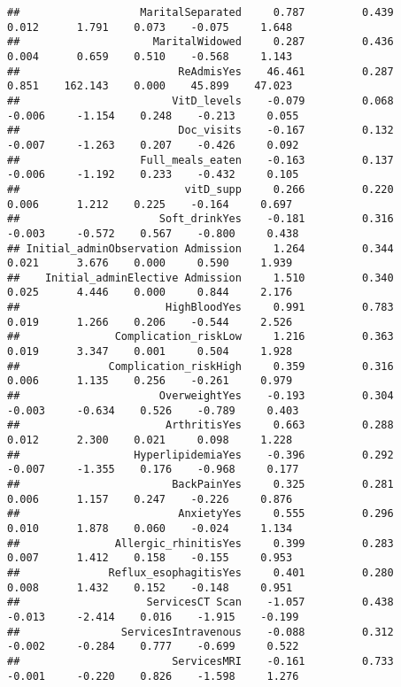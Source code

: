 \documentclass[
]{article}
\begin{document}
\begin{verbatim}
##                   MaritalSeparated     0.787         0.439        0.012      1.791    0.073    -0.075     1.648 
##                     MaritalWidowed     0.287         0.436        0.004      0.659    0.510    -0.568     1.143 
##                         ReAdmisYes    46.461         0.287        0.851    162.143    0.000    45.899    47.023 
##                        VitD_levels    -0.079         0.068       -0.006     -1.154    0.248    -0.213     0.055 
##                         Doc_visits    -0.167         0.132       -0.007     -1.263    0.207    -0.426     0.092 
##                   Full_meals_eaten    -0.163         0.137       -0.006     -1.192    0.233    -0.432     0.105 
##                          vitD_supp     0.266         0.220        0.006      1.212    0.225    -0.164     0.697 
##                      Soft_drinkYes    -0.181         0.316       -0.003     -0.572    0.567    -0.800     0.438 
## Initial_adminObservation Admission     1.264         0.344        0.021      3.676    0.000     0.590     1.939 
##    Initial_adminElective Admission     1.510         0.340        0.025      4.446    0.000     0.844     2.176 
##                       HighBloodYes     0.991         0.783        0.019      1.266    0.206    -0.544     2.526 
##               Complication_riskLow     1.216         0.363        0.019      3.347    0.001     0.504     1.928 
##              Complication_riskHigh     0.359         0.316        0.006      1.135    0.256    -0.261     0.979 
##                      OverweightYes    -0.193         0.304       -0.003     -0.634    0.526    -0.789     0.403 
##                       ArthritisYes     0.663         0.288        0.012      2.300    0.021     0.098     1.228 
##                  HyperlipidemiaYes    -0.396         0.292       -0.007     -1.355    0.176    -0.968     0.177 
##                        BackPainYes     0.325         0.281        0.006      1.157    0.247    -0.226     0.876 
##                         AnxietyYes     0.555         0.296        0.010      1.878    0.060    -0.024     1.134 
##               Allergic_rhinitisYes     0.399         0.283        0.007      1.412    0.158    -0.155     0.953 
##              Reflux_esophagitisYes     0.401         0.280        0.008      1.432    0.152    -0.148     0.951 
##                    ServicesCT Scan    -1.057         0.438       -0.013     -2.414    0.016    -1.915    -0.199 
##                ServicesIntravenous    -0.088         0.312       -0.002     -0.284    0.777    -0.699     0.522 
##                        ServicesMRI    -0.161         0.733       -0.001     -0.220    0.826    -1.598     1.276 

\end{verbatim}
\end{document}
